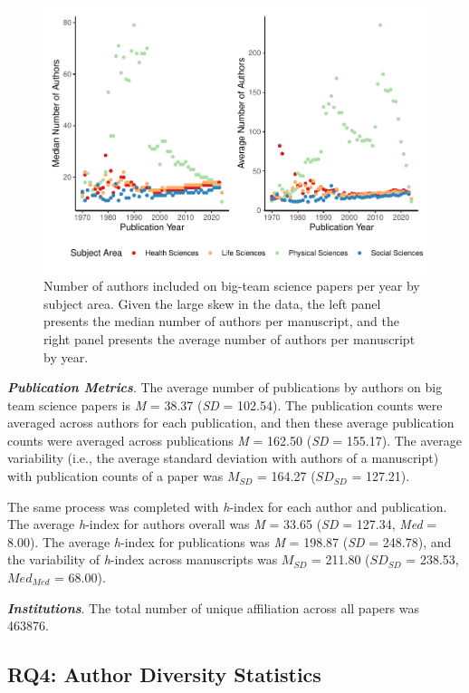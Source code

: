 \documentclass[
  man,floatsintext]{apa6}
\begin{document}
\begin{figure}
\centering
\includegraphics{manuscript_scopus_files/figure-latex/fig-author-year-1.pdf}
\caption{\label{fig:fig-author-year}Number of authors included on big-team science papers per year by subject area. Given the large skew in the data, the left panel presents the median number of authors per manuscript, and the right panel presents the average number of authors per manuscript by year.}
\end{figure}

\textbf{\emph{Publication Metrics}}. The average number of publications by authors on big team science papers
is \emph{M} = 38.37 (\emph{SD} = 102.54). The
publication counts were averaged across authors for each publication,
and then these average publication counts were averaged across
publications \emph{M} = 162.50 (\emph{SD} =
155.17). The average variability (i.e., the average
standard deviation with authors of a manuscript) with publication counts
of a paper was \(M_{SD}\) = 164.27 (\(SD_{SD}\) =
127.21).

The same process was completed with \emph{h}-index for each author and
publication. The average \emph{h}-index for authors overall was \emph{M} =
33.65 (\emph{SD} = 127.34, \emph{Med} = 8.00). The
average \emph{h}-index for publications was \emph{M} = 198.87 (\emph{SD}
= 248.78), and the variability of \emph{h}-index across
manuscripts was \(M_{SD}\) = 211.80 (\(SD_{SD}\) =
238.53, \(Med_{Med}\) = 68.00).

\textbf{\emph{Institutions}}. The total number of unique affiliation across all papers was 463876.

\hypertarget{rq4-author-diversity-statistics-1}{%
\subsection{RQ4: Author Diversity Statistics}\label{rq4-author-diversity-statistics-1}}
\end{document}
